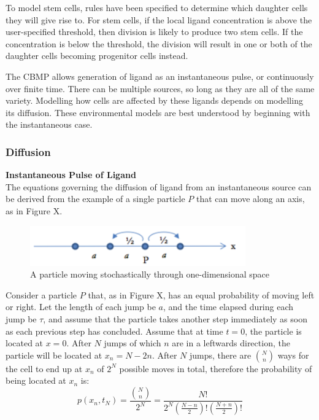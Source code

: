 \documentclass[12pt]{article}
\begin{document}
To model stem cells, rules have been specified to determine which 
daughter cells they will give rise to. For stem cells, if the local 
ligand concentration is above the user-specified threshold, then 
division is likely to produce two stem cells. If the concentration is 
below the threshold, the division will result in one or both of the 
daughter cells becoming progenitor cells instead.

The CBMP allows generation of ligand as an instantaneous pulse, or 
continuously over finite time. There can be multiple sources, so long as 
they are all of the same variety. Modelling how cells are affected by 
these ligands depends on modelling its diffusion. These environmental 
models are best understood by beginning with the instantaneous case.

\subsubsection{Diffusion}
{\bfseries Instantaneous Pulse of Ligand} \\
The equations governing the diffusion of ligand from an instantaneous 
source can be derived from the example of a single particle \(P\) that can 
move along an axis, as in Figure X.

\begin{figure}[H]
\centering
\includegraphics[width=9.28cm]{media/particlep.png}
\caption[]{A particle moving stochastically through 
one-dimensional space}
\end{figure}

Consider a particle \(P\) that, as in Figure X, has an equal probability of 
moving left or right. Let the length of each jump be \(a\), and 
the time elapsed during each jump be \(\tau\), and assume that 
the particle takes another step immediately as soon as each previous 
step has concluded. Assume that at time 
\(t=0\), the particle is located at \(x=0\). After \(N\) jumps of which \(n\) are in a 
leftwards direction, the particle will be located at \(x_n = N-2n\). 
After \(N\) jumps, there are \(\binom{N}{n}\) ways 
for the cell to end up at \(x_n\) of \(2^N\) possible moves in 
total, therefore the probability of being located at \(x_n\) is:
\begin{equation} 
  p(x_n,t_N) = \frac{\binom{N}{n}}{2^N} = \frac{N!}{2^N(\frac{N-n}{2})!(\frac{N+n}{2})!}
\end{equation}
\end{document}
